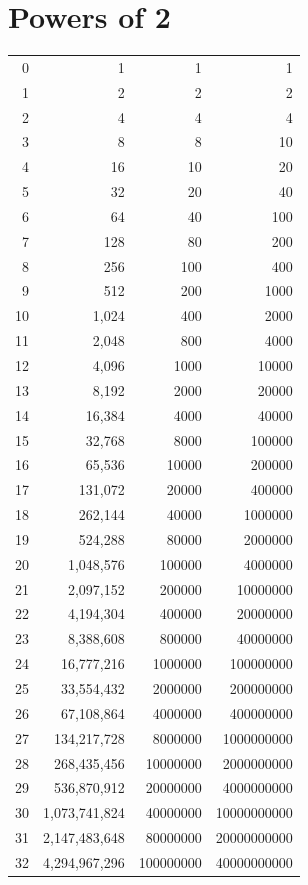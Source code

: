 \documentclass[10pt,twoside,openright]{memoir}
\begin{document}
\chapter{Powers of 2}

{\footnotesize
\begin{tabular}{rrrr}
0 & 1 & 1 & 1 \\
1 & 2 & 2 & 2 \\
2 & 4 & 4 & 4 \\
3 & 8 & 8 & 10 \\
4 & 16 & 10 & 20 \\
5 & 32 & 20 & 40 \\
6 & 64 & 40 & 100 \\
7 & 128 & 80 & 200 \\
8 & 256 & 100 & 400 \\
9 & 512 & 200 & 1000 \\
10 & 1,024 & 400 & 2000 \\
11 & 2,048 & 800 & 4000 \\
12 & 4,096 & 1000 & 10000 \\
13 & 8,192 & 2000 & 20000 \\
14 & 16,384 & 4000 & 40000 \\
15 & 32,768 & 8000 & 100000 \\
16 & 65,536 & 10000 & 200000 \\
17 & 131,072 & 20000 & 400000 \\
18 & 262,144 & 40000 & 1000000 \\
19 & 524,288 & 80000 & 2000000 \\
20 & 1,048,576 & 100000 & 4000000 \\
21 & 2,097,152 & 200000 & 10000000 \\
22 & 4,194,304 & 400000 & 20000000 \\
23 & 8,388,608 & 800000 & 40000000 \\
24 & 16,777,216 & 1000000 & 100000000 \\
25 & 33,554,432 & 2000000 & 200000000 \\
26 & 67,108,864 & 4000000 & 400000000 \\
27 & 134,217,728 & 8000000 & 1000000000 \\
28 & 268,435,456 & 10000000 & 2000000000 \\
29 & 536,870,912 & 20000000 & 4000000000 \\
30 & 1,073,741,824 & 40000000 & 10000000000 \\
31 & 2,147,483,648 & 80000000 & 20000000000 \\
32 & 4,294,967,296 & 100000000 & 40000000000 \\
\end{tabular}
}
\end{document}
